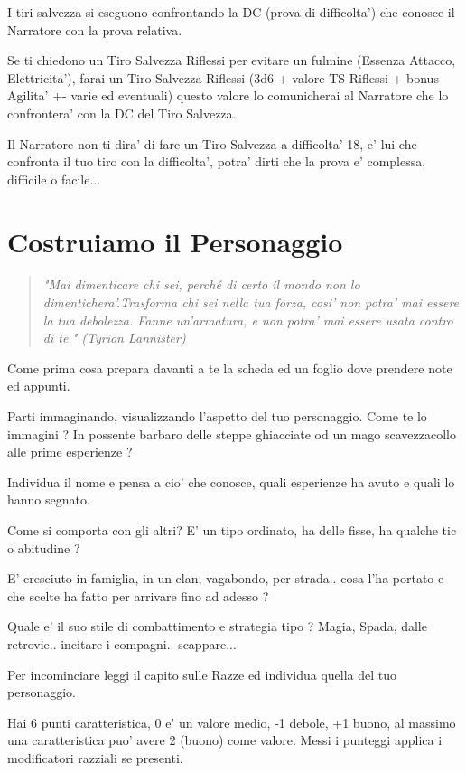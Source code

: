 \documentclass[a4paper,11pt,twoside,openany]{book}
\begin{document}
I tiri salvezza si eseguono confrontando la DC (prova di difficolta') che conosce il Narratore con la prova relativa.

Se ti chiedono un Tiro Salvezza Riflessi per evitare un fulmine (Essenza Attacco, Elettricita'), farai un Tiro Salvezza Riflessi (3d6 + valore TS Riflessi + bonus Agilita' +- varie ed eventuali) questo valore lo comunicherai al Narratore che lo confrontera' con la DC del Tiro Salvezza.

Il Narratore non ti dira' di fare un Tiro Salvezza a difficolta' 18, e' lui che confronta il tuo tiro con la difficolta', potra' dirti che la prova e' complessa, difficile o facile...


\pagebreak

\section{Costruiamo il Personaggio}

\label{costruiamo-il-personaggio}
\begin{quote}\textit{
"Mai dimenticare chi sei, perché di certo il mondo non lo dimentichera'.Trasforma chi sei nella tua forza, cosi' non potra' mai essere la tua debolezza. Fanne un'armatura, e non potra' mai essere usata contro di te." (Tyrion Lannister)
}\end{quote}
	
Come prima cosa prepara davanti a te la scheda ed un foglio dove prendere note ed appunti.

Parti immaginando, visualizzando l'aspetto del tuo personaggio. Come te lo immagini ? In possente barbaro delle steppe ghiacciate od un mago scavezzacollo alle prime esperienze ?

Individua il nome e pensa a cio' che conosce, quali esperienze ha avuto e quali lo hanno segnato.

Come si comporta con gli altri? E' un tipo ordinato, ha delle fisse, ha qualche tic o abitudine ?

E' cresciuto in famiglia, in un clan, vagabondo, per strada.. cosa l'ha portato e che scelte ha fatto per arrivare fino ad adesso ?

Quale e' il suo stile di combattimento e strategia tipo ? Magia, Spada, dalle retrovie.. incitare i compagni.. scappare...

Per incominciare leggi il capito sulle Razze ed individua quella del tuo personaggio.

Hai 6 punti caratteristica, 0 e' un valore medio, -1 debole, +1 buono, al massimo una caratteristica puo' avere 2 (buono) come valore. Messi i punteggi applica i modificatori razziali se presenti.
\end{document}

